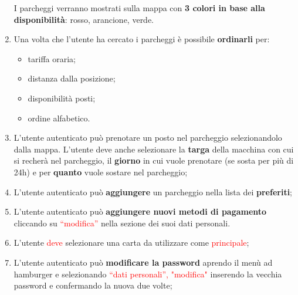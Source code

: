 \begin{enumerate}[start=3,label={\bfseries RF\arabic*}]
\begin{itemize}
    \end{itemize}
    \subitem I parcheggi verranno mostrati sulla mappa con \textbf{3 colori in base alla disponibilità}: rosso, arancione, verde.
    \item \label{itm:RF7} Una volta che l’utente ha cercato i parcheggi è possibile \textbf{ordinarli} per:
    \begin{itemize}
        \item tariffa oraria;
        \item distanza dalla posizione;
        \item disponibilità posti;
        \item ordine alfabetico.
    \end{itemize}
    \item \label{itm:RF8}L’utente autenticato può prenotare un posto nel parcheggio selezionandolo dalla mappa. L’utente deve anche selezionare la \textbf{targa} della macchina con cui si recherà nel parcheggio, il \textbf{giorno} in cui vuole prenotare (se sosta per più di 24h) e per \textbf{quanto} vuole sostare nel parcheggio;
    \item \label{itm:RF9}L'utente autenticato può \textbf{aggiungere} un parcheggio nella lista dei \textbf{preferiti};
    \item \label{itm:RF10}L’utente autenticato può \textbf{aggiungere nuovi metodi di pagamento} cliccando su \textcolor{red}{“modifica”} nella sezione dei suoi dati personali.
    \item \label{itm:RF11}L’utente \textcolor{red}{deve} selezionare una carta da utilizzare come \textcolor{red}{principale};
    \item \label{itm:RF12}L’utente autenticato può \textbf{modificare la password} aprendo il menù ad hamburger e selezionando \textcolor{red}{“dati personali”, "modifica"} inserendo la vecchia password e confermando la nuova due volte;
\end{enumerate}

